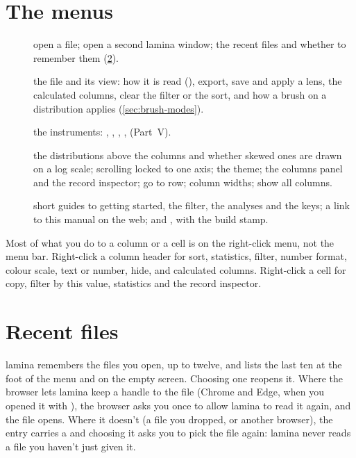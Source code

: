 \section{The menus}\label{sec:menus}

\begin{description}
\item[] open a file; open a second lamina window; the recent files and
whether to remember them (\cref{sec:recents}).
\item[] the file and its view: how it is read
(), export, save and apply a lens, the calculated
columns, clear the filter or the sort, and how a brush on a distribution applies
(\cref{sec:brush-modes}).
\item[] the instruments: ,
, , ,  (Part~V).
\item[] the distributions above the columns and whether skewed ones are
drawn on a log scale; scrolling locked to one axis; the theme; the columns panel and the record
inspector; go to row; column widths; show all columns.
\item[] short guides to getting started, the filter, the analyses and the
keys; a link to this manual on the web; and , with the build stamp.
\end{description}

Most of what you do to a column or a cell is on the right-click menu, not the menu bar. Right-click a
column header for sort, statistics, filter, number format, colour scale, text or number, hide, and
calculated columns. Right-click a cell for copy, filter by this value, statistics and the record
inspector.

\section{Recent files}\label{sec:recents}

lamina remembers the files you open, up to twelve, and lists the last ten at the foot of the
 menu and on the empty screen. Choosing one reopens it. Where the browser lets lamina keep a
handle to the file (Chrome and Edge, when you opened it with ), the browser asks you once to
allow lamina to read it again, and the file opens. Where it doesn't (a file you dropped, or another
browser), the entry carries a  and choosing it asks you to pick the file again: lamina never reads
a file you haven't just given it.

